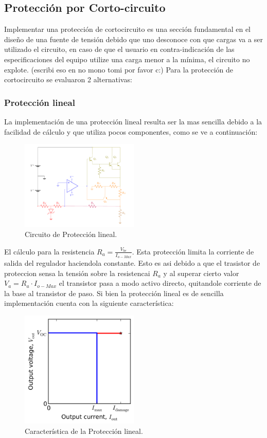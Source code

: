 \subsection{Protección por Corto-circuito}
Implementar una protección de cortocircuito es una sección fundamental en el diseño de una fuente de tensión debido que uno desconoce con que cargas va  a ser utilizado el circuito, en caso de que el usuario en contra-indicación de las especificaciones del equipo utilize una carga menor a la mínima, el circuito no explote. (escribi eso en no mono tomi por favor c:) 
Para la protección de cortocircuito se evaluaron 2 alternativas:
\subsubsection{Protección lineal}
La implementación de una protección lineal resulta ser la mas sencilla debido a la facilidad de cálculo y que utiliza pocos componentes, como se ve a continuación:
\begin{figure}[H]
\centering
	\includegraphics[width=0.5\textwidth, page=3]{ImagenesEjercicio2/Regulador.pdf}
	\caption{Circuito de Protección lineal.}
	\label{fig:circuitolineal}
\end{figure}
El cálculo para la resistencia $R_a= \frac{V_{be}}{I_{o-Max}}$.
Esta protección limita la corriente de salida del regulador haciendola constante. Esto es asi debido a que el trasistor de proteccion sensa la tensión sobre la resistencai $R_a$ y al superar cierto valor $V_a = R_a \cdot I_{o-Max} $ el transistor pasa a modo activo directo, quitandole corriente de la base al transistor de paso.
Si bien la protección lineal es de sencilla implementación cuenta con la siguiente característica:
\begin{figure}[H]
\centering
	\includegraphics[width=0.5\textwidth]{ImagenesEjercicio2/Linearprotection.png}
	\caption{Característica de la Protección lineal.}
	\label{fig:circuitolinealcarac}
\end{figure}
